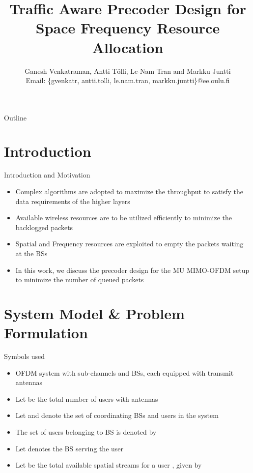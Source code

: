 \documentclass[10pt]{beamer}
\title{Traffic Aware Precoder Design for Space Frequency Resource Allocation}
\author{{Ganesh Venkatraman, Antti T\"{o}lli, Le-Nam Tran and Markku Juntti} \\ \scriptsize{Email: \{gvenkatr, antti.tolli, le.nam.tran, markku.juntti\}@ee.oulu.fi}}
\begin{document}
\AtBeginSection{\frame{\sectionpage}}

\begin{frame}
    \titlepage
\end{frame}

\begin{frame}{Outline}
    \tableofcontents
\end{frame}

\section{Introduction}

\begin{frame}{Introduction and Motivation}
\begin{itemize}
\item Complex algorithms are adopted to maximize the throughput to satisfy the data requirements of the higher layers
\item Available wireless resources are to be utilized efficiently to minimize the backlogged packets 
\item Spatial and Frequency resources are exploited to empty the packets waiting at the \acsp{BS}
\item In this work, we discuss the precoder design for the \acl{MU} \acs{MIMO}-\acs{OFDM} setup to minimize the number of queued packets 
\end{itemize}
\end{frame}

\section{System Model \& Problem Formulation}

\begin{frame}{Symbols used}
\begin{itemize}
\item \acs{OFDM} system with  sub-channels and  \acp{BS}, each equipped with  transmit antennas
\item Let  be the total number of users with  antennas
\item Let  and  denote the set of coordinating \acp{BS} and users in the system
\item The set of users belonging to \acs{BS}  is denoted by 
\item Let  denotes the \ac{BS} serving the user 
\item Let  be the total available spatial streams for a user , given by 
\end{itemize}
\end{frame}
\end{document}
